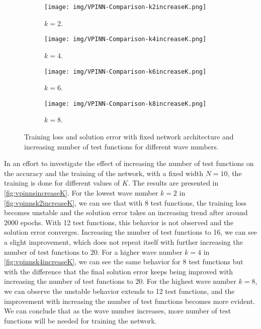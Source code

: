 \begin{figure}[h!]
    \centering
    \begin{subfigure}[b]{0.48\textwidth}
        \texttt{[image: img/VPINN-Comparison-k2increaseK.png]}
        \caption{$k=2$.}
        \label{fig:vpinnsk2increaseK}
    \end{subfigure}
    \hfill
    \begin{subfigure}[b]{0.48\textwidth}
        \texttt{[image: img/VPINN-Comparison-k4increaseK.png]}
        \caption{$k=4$.}
        \label{fig:vpinnsk4increaseK}
    \end{subfigure}
    \vfill
    \begin{subfigure}[b]{0.48\textwidth}
        \texttt{[image: img/VPINN-Comparison-k6increaseK.png]}
        \caption{$k=6$.}
        \label{fig:vpinnsk6increaseK}
    \end{subfigure}
    \hfill
    \begin{subfigure}[b]{0.48\textwidth}
        \texttt{[image: img/VPINN-Comparison-k8increaseK.png]}
        \caption{$k=8$.}
        \label{fig:vpinnsk8increaseK}
    \end{subfigure}
    \caption{Training loss and solution error with fixed network architecture and increasing number of test functions for different wave numbers.}
    \label{fig:vpinnsincreaseK}
\end{figure}

In an effort to investigate the effect of increasing the number of test functions on the accuracy and the training of the network, with a fixed width $N=10$, the training is done for different values of $K$. The results are presented in \autoref{fig:vpinnsincreaseK}. For the lowest wave number $k=2$ in \autoref{fig:vpinnsk2increaseK}, we can see that with 8 test functions, the training loss becomes unstable and the solution error takes an increasing trend after around 2000 epochs. With 12 test functions, this behavior is not observed and the solution error converges. Increasing the number of test functions to 16, we can see a slight improvement, which does not repeat itself with further increasing the number of test functions to 20. For a higher wave number $k=4$ in \autoref{fig:vpinnsk4increaseK}, we can see the same behavior for 8 test functions but with the difference that the final solution error keeps being improved with increasing the number of test functions to 20. For the highest wave number $k=8$, we can observe the unstable behavior extends to 12 test functions, and the improvement with increasing the number of test functions becomes more evident. We can conclude that as the wave number increases, more number of test functions will be needed for training the network.

